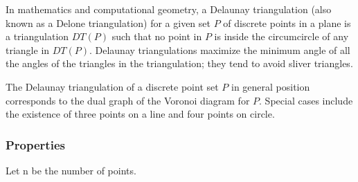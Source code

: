 In mathematics and computational geometry, a Delaunay triangulation (also known as a Delone triangulation) for a given set $P$ of discrete points in a plane is a triangulation $DT(P)$ such that no point in $P$ is inside the circumcircle of any triangle in $DT(P)$. Delaunay triangulations maximize the minimum angle of all the angles of the triangles in the triangulation; they tend to avoid sliver triangles.

The Delaunay triangulation of a discrete point set $P$ in general position corresponds to the dual graph of the Voronoi diagram for $P$. Special cases include the existence of three points on a line and four points on circle.

\subsubsection{Properties}
Let n be the number of points.

